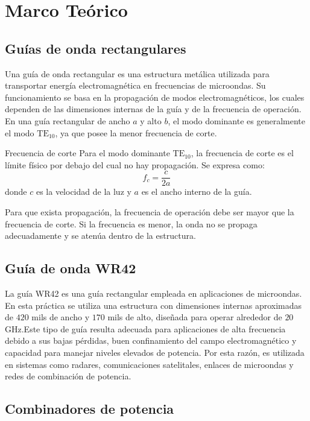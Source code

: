 \section{Marco Teórico}

\subsection{Guías de onda rectangulares}

Una guía de onda rectangular es una estructura metálica utilizada para transportar energía electromagnética en frecuencias de microondas. Su funcionamiento se basa en la propagación de modos electromagnéticos, los cuales dependen de las dimensiones internas de la guía y de la frecuencia de operación. En una guía rectangular de ancho $a$ y alto $b$, el modo dominante es generalmente el modo $\text{TE}_{10}$, ya que posee la menor frecuencia de corte.

\begin{conceptcard}{Frecuencia de corte}
Para el modo dominante $\text{TE}_{10}$, la frecuencia de corte es el límite físico por debajo del cual no hay propagación. Se expresa como:
\begin{equation}
f_c = \frac{c}{2a}
\end{equation}
donde $c$ es la velocidad de la luz y $a$ es el ancho interno de la guía.
\end{conceptcard}

Para que exista propagación, la frecuencia de operación debe ser mayor que la frecuencia de corte. Si la frecuencia es menor, la onda no se propaga adecuadamente y se atenúa dentro de la estructura.

\subsection{Guía de onda WR42}

La guía WR42 es una guía rectangular empleada en aplicaciones de microondas. En esta práctica se utiliza una estructura con dimensiones internas aproximadas de $420$ mils de ancho y $170$ mils de alto, diseñada para operar alrededor de $20$ GHz.Este tipo de guía resulta adecuada para aplicaciones de alta frecuencia debido a sus bajas pérdidas, buen confinamiento del campo electromagnético y capacidad para manejar niveles elevados de potencia. Por esta razón, es utilizada en sistemas como radares, comunicaciones satelitales, enlaces de microondas y redes de combinación de potencia.

\subsection{Combinadores de potencia}

